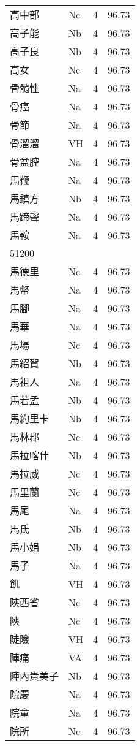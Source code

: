 \documentclass[twocolumn]{book}
\begin{document}
\begin{supertabular}{llrr}
高中部 & Nc & 4 &  96.73\\
高子能 & Nb & 4 &  96.73\\
高子良 & Nb & 4 &  96.73\\
高女 & Nc & 4 &  96.73\\
骨髓性 & Na & 4 &  96.73\\
骨癌 & Na & 4 &  96.73\\
骨節 & Na & 4 &  96.73\\
骨溜溜 & VH & 4 &  96.73\\
骨盆腔 & Na & 4 &  96.73\\
馬鞭 & Na & 4 &  96.73\\
馬鎮方 & Nb & 4 &  96.73\\
馬蹄聲 & Na & 4 &  96.73\\
馬鞍 & Na & 4 &  96.73\\
51200\\
馬德里 & Nc & 4 &  96.73\\
馬幣 & Na & 4 &  96.73\\
馬腳 & Na & 4 &  96.73\\
馬華 & Na & 4 &  96.73\\
馬場 & Nc & 4 &  96.73\\
馬紹賀 & Nb & 4 &  96.73\\
馬祖人 & Na & 4 &  96.73\\
馬若孟 & Nb & 4 &  96.73\\
馬約里卡 & Nb & 4 &  96.73\\
馬林郡 & Nc & 4 &  96.73\\
馬拉喀什 & Nb & 4 &  96.73\\
馬拉威 & Nc & 4 &  96.73\\
馬里蘭 & Nc & 4 &  96.73\\
馬尾 & Na & 4 &  96.73\\
馬氏 & Nb & 4 &  96.73\\
馬小娟 & Nb & 4 &  96.73\\
馬子 & Na & 4 &  96.73\\
飢 & VH & 4 &  96.73\\
陝西省 & Nc & 4 &  96.73\\
陝 & Nc & 4 &  96.73\\
陡險 & VH & 4 &  96.73\\
陣痛 & VA & 4 &  96.73\\
陣內貴美子 & Nb & 4 &  96.73\\
院慶 & Na & 4 &  96.73\\
院童 & Na & 4 &  96.73\\
院所 & Nc & 4 &  96.73\\

\end{supertabular}
\end{document}
